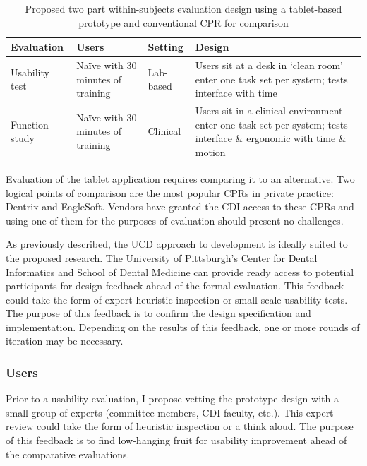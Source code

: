 \documentclass[11pt]{article}
\newcommand{\ra}[1]{\renewcommand{\arraystretch}{#1}}
\begin{document}
\begin{table}[h!b]
\label{evaldesign}
\caption{Proposed two part within-subjects evaluation design using a tablet-based prototype and conventional CPR for comparison}
	\begin{center}
	\ra{1.3}
\begin{tabular*}{\textwidth}{p{1.9cm}p{2cm}p{1.9cm}p{5.1cm}}  
\toprule
\textbf{Evaluation} & \textbf{Users} & \textbf{Setting} & \textbf{Design} \\
\midrule
Usability test & Na\"{i}ve with 30 minutes of training & Lab-based & Users sit at a desk in `clean room' enter one task set per system; tests interface with time \vspace{4pt}\\ 

Function study & Na\"{i}ve with 30 minutes of training & Clinical & Users sit in a clinical environment enter one task set per system; tests interface \& ergonomic with time \& motion \\
\bottomrule
\end{tabular*} \end{center}\end{table}

Evaluation of the tablet application requires comparing it to an alternative. Two logical points of comparison are the most popular CPRs in private practice: Dentrix and EagleSoft. Vendors have granted the CDI access to these CPRs and using one of them for the purposes of evaluation should present no challenges.

As previously described, the UCD approach to development is ideally suited to the proposed research. The University of Pittsburgh's Center for Dental Informatics and School of Dental Medicine can provide ready access to potential participants for design feedback ahead of the formal evaluation. This feedback could take the form of expert heuristic inspection or small-scale usability tests. The purpose of this feedback is to confirm the design specification and implementation. Depending on the results of this feedback, one or more rounds of iteration may be necessary.

\subsubsection{Users}
Prior to a usability evaluation, I propose vetting the prototype design with a small group of experts (committee members, CDI faculty, etc.). This expert review could take the form of heuristic inspection or a think aloud. The purpose of this feedback is to find low-hanging fruit for usability improvement ahead of the comparative evaluations. 
\end{document}
